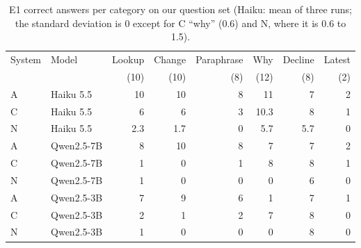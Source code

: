 \begin{table}[ht]
\centering\small
\begin{tabular}{llrrrrrr}
\toprule
System & Model & Lookup & Change & Paraphrase & Why & Decline & Latest \\
 & & (10) & (10) & (8) & (12) & (8) & (2) \\
\midrule
A & Haiku 5.5  & 10 & 10 & 8 & 11 & 7 & 2 \\
C & Haiku 5.5  & 6  & 6  & 3 & 10.3 & 8 & 1 \\
N & Haiku 5.5  & 2.3 & 1.7 & 0 & 5.7 & 5.7 & 0 \\
\midrule
A & Qwen2.5-7B & 8  & 10 & 8 & 7  & 7 & 2 \\
C & Qwen2.5-7B & 1  & 0  & 1 & 8  & 8 & 1 \\
N & Qwen2.5-7B & 1  & 0  & 0 & 0  & 6 & 0 \\
\midrule
A & Qwen2.5-3B & 7  & 9  & 6 & 1  & 7 & 1 \\
C & Qwen2.5-3B & 2  & 1  & 2 & 7  & 8 & 0 \\
N & Qwen2.5-3B & 1  & 0  & 0 & 0  & 8 & 0 \\
\bottomrule
\end{tabular}
\caption{E1 correct answers per category on our question set (Haiku: mean of three runs; the
standard deviation is 0 except for C ``why'' (0.6) and N, where it is 0.6 to 1.5).}
\label{tab:e1-cat}
\end{table}

